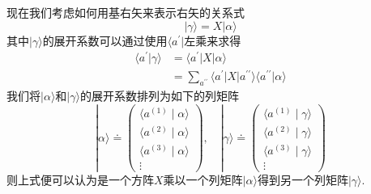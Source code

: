 \documentclass[lang=cn,newtx,10pt,scheme=chinese,thmcnt=section]{elegantbook}
\begin{document}
现在我们考虑如何用基右矢来表示右矢的关系式
\begin{equation}
	|\gamma\rangle=X|\alpha\rangle 
\end{equation}
其中$|\gamma\rangle$的展开系数可以通过使用$\langle a^{'}|$左乘来求得
\begin{equation}
	\begin{aligned}\langle a^{\prime}|\gamma\rangle&=\langle a^{\prime}| X|\alpha\rangle\\&=\sum_{a^{\prime\prime}}\langle a^{\prime}| X| a^{\prime\prime}\rangle\langle a^{\prime\prime}|\alpha\rangle\end{aligned}
\end{equation}
我们将$|\alpha\rangle$和$|\gamma\rangle$的展开系数排列为如下的列矩阵
\begin{equation}
	|\alpha\rangle\doteq\begin{pmatrix}\langle a^{(1)}\mid\alpha\rangle\\\langle a^{(2)}\mid\alpha\rangle\\\langle a^{(3)}\mid\alpha\rangle\\\vdots\end{pmatrix},\quad|\gamma\rangle\doteq
	\begin{pmatrix}\langle a^{(1)}\mid\gamma\rangle\\\langle a^{(2)}\mid\gamma\rangle\\\langle a^{(3)}\mid\gamma\rangle\\\vdots\end{pmatrix}
\end{equation}
则上式便可以认为是一个方阵$X$乘以一个列矩阵$|\alpha\rangle$得到另一个列矩阵$|\gamma\rangle$.
\end{document}
